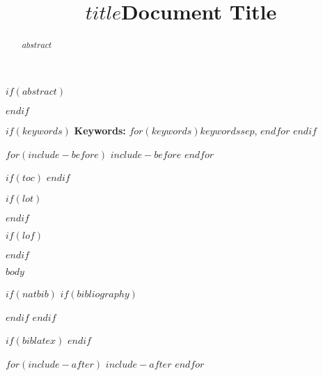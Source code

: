 \documentclass[10pt,twocolumn]{article}
\title{$title$}
\title{Document Title}
\begin{document}
\maketitle

$if(abstract)$
\begin{abstract}
$abstract$
\end{abstract}
$endif$

$if(keywords)$
\noindent\textbf{Keywords:} $for(keywords)$$keywords$$sep$, $endfor$
$endif$

$for(include-before)$
$include-before$
$endfor$

$if(toc)$
\tableofcontents
$endif$

$if(lot)$
\listoftables
$endif$

$if(lof)$
\listoffigures
$endif$

$body$

$if(natbib)$
$if(bibliography)$

$endif$
$endif$

$if(biblatex)$
\printbibliography
$endif$

$for(include-after)$
$include-after$
$endfor$
\end{document}
